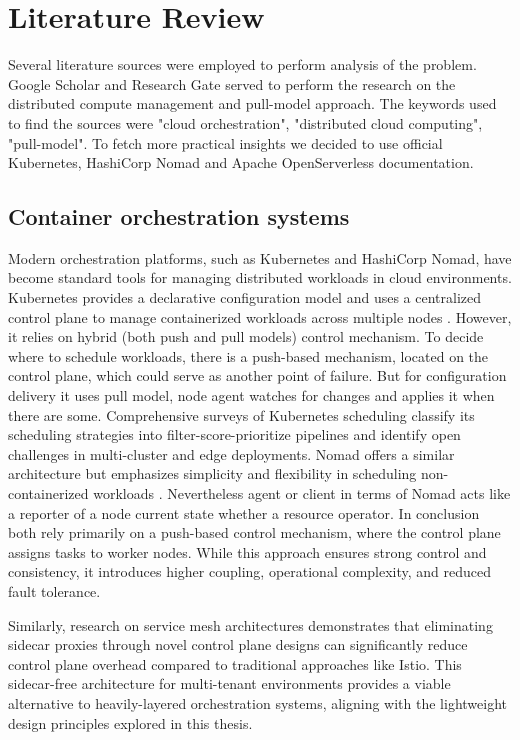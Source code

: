 \chapter{Literature Review}
\label{chap:lr}

Several literature sources were employed to perform analysis of the problem. Google Scholar and Research Gate served to perform the research on the distributed compute management and pull-model approach. The keywords used to find the sources were "cloud orchestration", "distributed cloud computing", "pull-model". To fetch more practical insights we decided to use official Kubernetes, HashiCorp Nomad and Apache OpenServerless documentation.

\section{Container orchestration systems}

Modern orchestration platforms, such as Kubernetes and HashiCorp Nomad, have become standard tools for managing distributed workloads in cloud environments. Kubernetes provides a declarative configuration model and uses a centralized control plane to manage containerized workloads across multiple nodes \cite{k8s_docs}. However, it relies on hybrid (both push and pull models) control mechanism. To decide where to schedule workloads, there is a push-based mechanism, located on the control plane, which could serve as another point of failure. But for configuration delivery it uses pull model, node agent watches for changes and applies it when there are some. Comprehensive surveys of Kubernetes scheduling \cite{carrion2022k8ssurvey, senjab2023k8salgorithms} classify its scheduling strategies into filter-score-prioritize pipelines and identify open challenges in multi-cluster and edge deployments. Nomad offers a similar architecture but emphasizes simplicity and flexibility in scheduling non-containerized workloads \cite{nomad_docs}. Nevertheless agent or client in terms of Nomad acts like a reporter of a node current state whether a resource operator. In conclusion both rely primarily on a push-based control mechanism, where the control plane assigns tasks to worker nodes. While this approach ensures strong control and consistency, it introduces higher coupling, operational complexity, and reduced fault tolerance.

Similarly, research on service mesh architectures \cite{canal2024mesh} demonstrates that eliminating sidecar proxies through novel control plane designs can significantly reduce control plane overhead compared to traditional approaches like Istio. This sidecar-free architecture for multi-tenant environments provides a viable alternative to heavily-layered orchestration systems, aligning with the lightweight design principles explored in this thesis.

